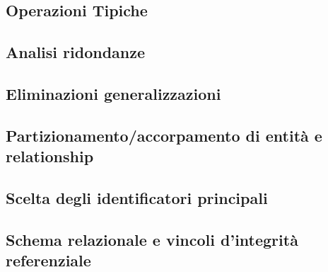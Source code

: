 \subsection{Operazioni Tipiche}


\subsection{Analisi ridondanze}
	
	
\subsection{Eliminazioni generalizzazioni}


\subsection{Partizionamento/accorpamento di entità e relationship}


\subsection{Scelta degli identificatori principali}


\subsection{Schema relazionale e vincoli d'integrità referenziale}


